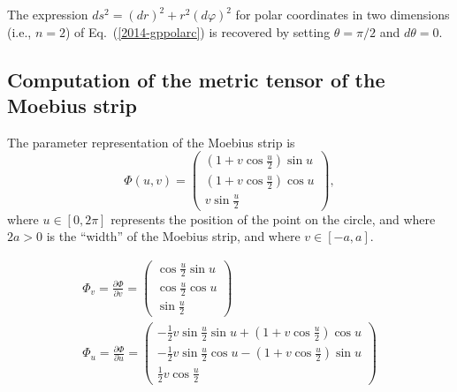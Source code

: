 {The expression $ds^2 =(dr)^2+r^2(d\varphi )^2$
for polar coordinates in two dimensions (i.e., $n=2$) of Eq.~(\ref{2014-gppolarc})  is recovered by setting $\theta = \pi/2 $ and $d\theta =0$.

\subsection*{Computation of the metric tensor of the Moebius strip}
The parameter representation of the Moebius strip is
\begin{equation}
\Phi (u,v) =\left(
\begin{array}{c}
(1+v\cos \frac{u}{2})\sin u \\
(1+v\cos \frac{u}{2})\cos u \\
v\sin \frac{u}{2}
\end{array}
\right),
\end{equation}
where
$u\in [0,2\pi ]$ represents the position of the point on the circle,  and where $2a>0$ is the ``width'' of the Moebius strip,
and where $v\in [-a,a]$.


\begin{equation}
\begin{split}
\Phi _{v}=\frac{\partial \Phi }{\partial v}=\allowbreak
\begin{pmatrix}
\cos \frac{u}{2}\sin u \\
\cos \frac{u}{2}\cos u \\
\sin \frac{u}{2}
\end{pmatrix}
 \\
\Phi _{u}=\frac{\partial \Phi }{\partial u}=\allowbreak
\begin{pmatrix}
-\frac{1}{2}v\sin \frac{u}{2}\sin u+\left( 1+v\cos \frac{u}{2}\right) \cos u \\
-\frac{1}{2}v\sin \frac{u}{2}\cos u-\left( 1+v\cos \frac{u}{2}\right) \sin u \\
\frac{1}{2}v\cos \frac{u}{2}
\end{pmatrix}
\end{split}
\end{equation}


}
